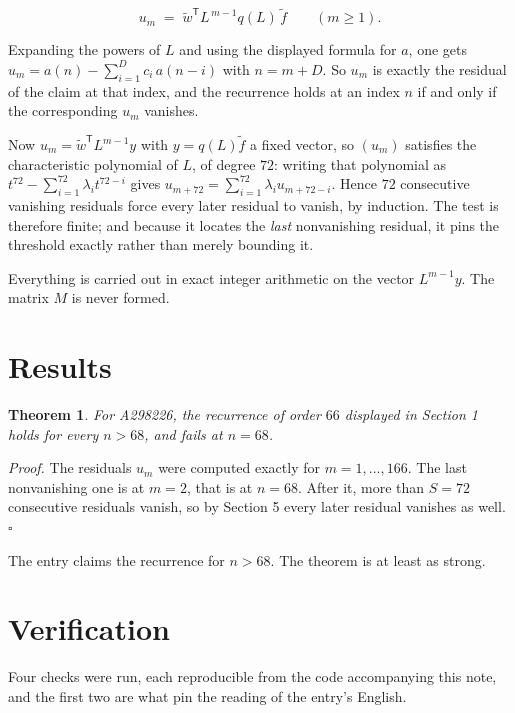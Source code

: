 \documentclass[11pt]{article}
\newtheorem{theorem}{Theorem}
\theoremstyle{definition}
\begin{document}
\[u_m \;=\; \tilde w^{\mathsf T} L^{\,m-1} q(L)\,\tilde f \qquad (m \ge 1).\]

Expanding the powers of $L$ and using the displayed formula for $a$, one gets $u_m = a(n) - \sum_{i=1}^{D} c_i\,a(n-i)$ with $n = m + D$. So $u_m$ is exactly the residual of the claim at that index, and the recurrence holds at an index $n$ if and only if the corresponding $u_m$ vanishes.

Now $u_m = \tilde w^{\mathsf T} L^{m-1} y$ with $y = q(L)\tilde f$ a fixed vector, so $(u_m)$ satisfies the characteristic polynomial of $L$, of degree $72$: writing that polynomial as $t^{72} - \sum_{i=1}^{72} \lambda_i t^{72-i}$ gives $u_{m+72} = \sum_{i=1}^{72} \lambda_i u_{m+72-i}$. Hence $72$ consecutive vanishing residuals force every later residual to vanish, by induction. The test is therefore finite; and because it locates the {\itshape last} nonvanishing residual, it pins the threshold exactly rather than merely bounding it.

Everything is carried out in exact integer arithmetic on the vector $L^{m-1}y$. The matrix $M$ is never formed.

\section{Results}

\begin{theorem} For A298226, the recurrence of order $66$ displayed in Section 1 holds for every $n > 68$, and fails at $n = 68$.\end{theorem}

{\itshape Proof.} The residuals $u_m$ were computed exactly for $m = 1,\dots,166$. The last nonvanishing one is at $m = 2$, that is at $n = 68$. After it, more than $S = 72$ consecutive residuals vanish, so by Section 5 every later residual vanishes as well. $\square$

The entry claims the recurrence for $n > 68$. The theorem is at least as strong.

\section{Verification}

Four checks were run, each reproducible from the code accompanying this note, and the first two are what pin the reading of the entry's English.
\end{document}
